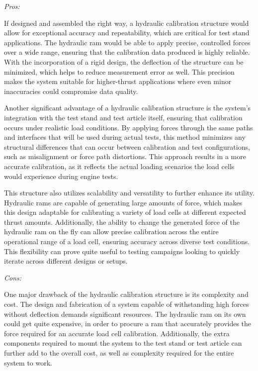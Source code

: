\noindent\textit{Pros:}

If designed and assembled the right way, a hydraulic calibration structure would allow for exceptional accuracy and repeatability, which are critical for test stand applications. The hydraulic ram would be able to apply precise, controlled forces over a wide range, ensuring that the calibration data produced is highly reliable. With the incorporation of a rigid design, the deflection of the structure can be minimized, which helps to reduce measurement error as well. This precision makes the system suitable for higher-thrust applications where even minor inaccuracies could compromise data quality.

Another significant advantage of a hydraulic calibration structure is the system’s integration with the test stand and test article itself, ensuring that calibration occurs under realistic load conditions. By applying forces through the same paths and interfaces that will be used during actual tests, this method minimizes any structural differences that can occur between calibration and test configurations, such as misalignment or force path distortions. This approach results in a more accurate calibration, as it reflects the actual loading scenarios the load cells would experience during engine tests.

This structure also utilizes scalability and versatility to further enhance its utility. Hydraulic rams are capable of generating large amounts of force, which makes this design adaptable for calibrating a variety of load cells at different expected thrust amounts. Additionally, the ability to change the generated force of the hydraulic ram on the fly can allow precise calibration across the entire operational range of a load cell, ensuring accuracy across diverse test conditions. This flexibility can prove quite useful to testing campaigns looking to quickly iterate across different designs or setups.

\noindent\textit{Cons:}

One major drawback of the hydraulic calibration structure is its complexity and cost. The design and fabrication of a system capable of withstanding high forces without deflection demands significant resources. The hydraulic ram on its own could get quite expensive, in order to procure a ram that accurately provides the force required for an accurate load cell calibration. Additionally, the extra components required to mount the system to the test stand or test article can further add to the overall cost, as well as complexity required for the entire system to work.

